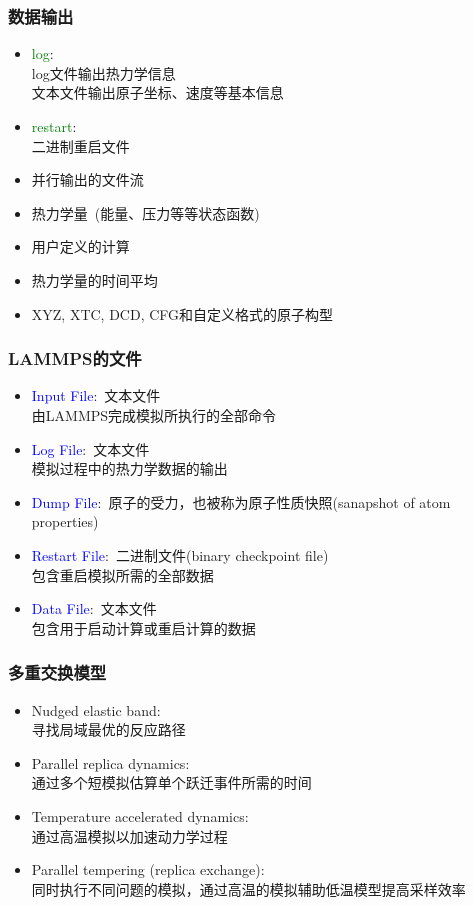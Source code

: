 \frame
{
	\frametitle{数据输出}
	\begin{itemize}
		\item \textcolor{green}{log}:\\
			\textrm{log}文件输出热力学信息\\
文本文件输出原子坐标、速度等基本信息
\item \textcolor{green}{restart}:\\
	二进制重启文件
\item 并行输出的文件流
\item 热力学量~(能量、压力等等状态函数)
\item 用户定义的计算
\item 热力学量的时间平均
\item \textrm{XYZ, XTC, DCD, CFG}和自定义格式的原子构型
	\end{itemize}
}

\frame
{
	\frametitle{\textrm{LAMMPS}的文件}
	\begin{itemize}
			\setlength{\itemsep}{10pt}
			\item \textcolor{blue}{\textrm{Input File}}:~文本文件\\由\textrm{LAMMPS}完成模拟所执行的全部命令
			\item \textcolor{blue}{\textrm{Log File}}:~文本文件\\模拟过程中的热力学数据的输出
			\item \textcolor{blue}{\textrm{Dump File}}:~原子的受力，也被称为原子性质快照\textrm{(sanapshot of atom properties)}
			\item \textcolor{blue}{\textrm{Restart File}}:~二进制文件\textrm{(binary checkpoint file)}\\包含重启模拟所需的全部数据
			\item \textcolor{blue}{\textrm{Data File}}:~文本文件\\包含用于启动计算或重启计算的数据 
	\end{itemize}
}

\frame
{
	\frametitle{多重交换模型}
	\begin{itemize}
			\setlength{\itemsep}{10pt}
		\item \textrm{Nudged elastic band}:\\
			寻找局域最优的反应路径
		\item \textrm{Parallel replica dynamics}:\\
			通过多个短模拟估算单个跃迁事件所需的时间
		\item \textrm{Temperature accelerated dynamics}:\\
			通过高温模拟以加速动力学过程
		\item \textrm{Parallel tempering (replica exchange)}:\\
			同时执行不同问题的模拟，通过高温的模拟辅助低温模型提高采样效率
	\end{itemize}
}

